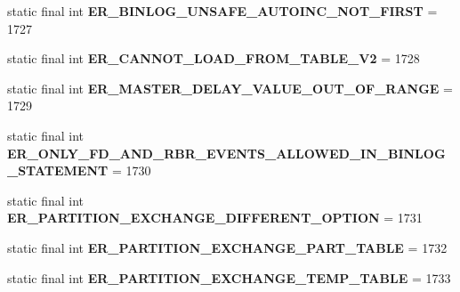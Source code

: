\begin{DoxyCompactItemize}
static final int {\bfseries E\+R\+\_\+\+B\+I\+N\+L\+O\+G\+\_\+\+U\+N\+S\+A\+F\+E\+\_\+\+A\+U\+T\+O\+I\+N\+C\+\_\+\+N\+O\+T\+\_\+\+F\+I\+R\+ST} = 1727
\item 
\mbox{\label{classcom_1_1mysql_1_1cj_1_1exceptions_1_1_mysql_error_numbers_a471ecf36e61f69f511878e33d1862f85}} 
static final int {\bfseries E\+R\+\_\+\+C\+A\+N\+N\+O\+T\+\_\+\+L\+O\+A\+D\+\_\+\+F\+R\+O\+M\+\_\+\+T\+A\+B\+L\+E\+\_\+\+V2} = 1728
\item 
\mbox{\label{classcom_1_1mysql_1_1cj_1_1exceptions_1_1_mysql_error_numbers_a16f27b94df6dcb9e2018f4790d7bc0b2}} 
static final int {\bfseries E\+R\+\_\+\+M\+A\+S\+T\+E\+R\+\_\+\+D\+E\+L\+A\+Y\+\_\+\+V\+A\+L\+U\+E\+\_\+\+O\+U\+T\+\_\+\+O\+F\+\_\+\+R\+A\+N\+GE} = 1729
\item 
\mbox{\label{classcom_1_1mysql_1_1cj_1_1exceptions_1_1_mysql_error_numbers_acf4fa834a00558ab33630bdd04a0ef86}} 
static final int {\bfseries E\+R\+\_\+\+O\+N\+L\+Y\+\_\+\+F\+D\+\_\+\+A\+N\+D\+\_\+\+R\+B\+R\+\_\+\+E\+V\+E\+N\+T\+S\+\_\+\+A\+L\+L\+O\+W\+E\+D\+\_\+\+I\+N\+\_\+\+B\+I\+N\+L\+O\+G\+\_\+\+S\+T\+A\+T\+E\+M\+E\+NT} = 1730
\item 
\mbox{\label{classcom_1_1mysql_1_1cj_1_1exceptions_1_1_mysql_error_numbers_a8dc04e46c4bb332d62182a8441562919}} 
static final int {\bfseries E\+R\+\_\+\+P\+A\+R\+T\+I\+T\+I\+O\+N\+\_\+\+E\+X\+C\+H\+A\+N\+G\+E\+\_\+\+D\+I\+F\+F\+E\+R\+E\+N\+T\+\_\+\+O\+P\+T\+I\+ON} = 1731
\item 
\mbox{\label{classcom_1_1mysql_1_1cj_1_1exceptions_1_1_mysql_error_numbers_ae4ba35d9ae67e2680772bafb472f9612}} 
static final int {\bfseries E\+R\+\_\+\+P\+A\+R\+T\+I\+T\+I\+O\+N\+\_\+\+E\+X\+C\+H\+A\+N\+G\+E\+\_\+\+P\+A\+R\+T\+\_\+\+T\+A\+B\+LE} = 1732
\item 
\mbox{\label{classcom_1_1mysql_1_1cj_1_1exceptions_1_1_mysql_error_numbers_afcf418771134c92d4381c2b8851d9e20}} 
static final int {\bfseries E\+R\+\_\+\+P\+A\+R\+T\+I\+T\+I\+O\+N\+\_\+\+E\+X\+C\+H\+A\+N\+G\+E\+\_\+\+T\+E\+M\+P\+\_\+\+T\+A\+B\+LE} = 1733

\end{DoxyCompactItemize}
